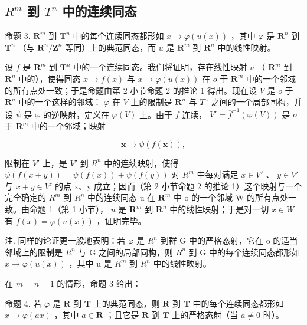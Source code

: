 \subsection{\texorpdfstring{\(R^{m}\) 到 \(T^{n}\) 中的连续同态}{R 的 m 次幂到 T 的 n 次幂中的连续同态}}

命题 3. \(\mathbf{R}^m\) 到 \(\mathbf{T}^n\) 中的每个连续同态都形如 \(x \to \varphi(u(x))\) ，其中 \(\varphi\) 是 \(\mathbf{R}^n\) 到 \(\mathbf{T}^n\) （与 \(\mathbf{R}^n / \mathbf{Z}^n\) 等同）上的典范同态，而 \(u\) 是 \(\mathbf{R}^m\) 到 \(\mathbf{R}^n\) 中的线性映射。

设 \(f\) 是 \(\mathbf{R}^m\) 到 \(\mathbf{T}^n\) 中的一个连续同态。我们将证明，存在线性映射 \(u\) （ \(\mathbf{R}^m\) 到 \(\mathbf{R}^n\) 中的），使得同态 \(x \to f(x)\) 与 \(x \to \varphi(u(x))\) 在 \(o\) 于 \(\mathbf{R}^m\) 中的一个邻域的所有点处一致；于是命题由第 2 小节命题 2 的推论 1 得出。现在设 \(V\) 是 \(o\) 于 \(\mathbf{R}^n\) 中的一个这样的邻域： \(\varphi\) 在 \(V\) 上的限制是 \(\mathbf{R}^n\) 与 \(T^n\) 之间的一个局部同构，并设 \(\psi\) 是 \(\varphi\) 的逆映射，定义在 \(\varphi(V)\) 上。由于 \(f\) 连续， \(V' = \overline{f}^{-1}(\varphi(V))\) 是 \(o\) 于 \(\mathbf{R}^m\) 中的一个邻域；映射

\[
\boldsymbol {x} \rightarrow \psi (f (\boldsymbol {x})),
\]

限制在 \(V'\) 上，是 \(V'\) 到 \(R^n\) 中的连续映射，使得 \(\psi(f(x+y)) = \psi(f(x)) + \psi(f(y))\) 对 \(R^m\) 中每对满足 \(x \in V'\) 、 \(y \in V'\) 与 \(x + y \in V'\) 的点 x、y 成立；因而（第 2 小节命题 2 的推论 1）这个映射与一个完全确定的 \(R^m\) 到 \(R^n\) 中的连续同态 u 在 \(\mathbf{R}^m\) 中 o 的一个邻域 W 的所有点处一致。由命题 1（第 1 小节）， \(u\) 是 \(\mathbf{R}^m\) 到 \(\mathbf{R}^n\) 中的线性映射；于是对一切 \(x \in W\) 有 \(f(x) = \varphi(u(x))\) ，证明完毕。

注. 同样的论证更一般地表明：若 \(\varphi\) 是 \(R^{n}\) 到群 G 中的严格态射，它在 o 的适当邻域上的限制是 \(R^{n}\) 与 G 之间的局部同构，则 \(R^{n}\) 到 G 中的每个连续同态都形如 \(x \to \varphi(u(x))\) ，其中 u 是 \(R^{m}\) 到 \(R^{n}\) 中的线性映射。

在 \(m = n = 1\) 的情形，命题 3 给出：

命题 4. 若 \(\varphi\) 是 \(\mathbf{R}\) 到 \(\mathbf{T}\) 上的典范同态，则 \(\mathbf{R}\) 到 \(\mathbf{T}\) 中的每个连续同态都形如 \(x \to \varphi(ax)\) ，其中 \(a \in \mathbf{R}\) ；且它是 \(\mathbf{R}\) 到 \(\mathbf{T}\) 上的严格态射（当 \(a \neq 0\) 时）。


